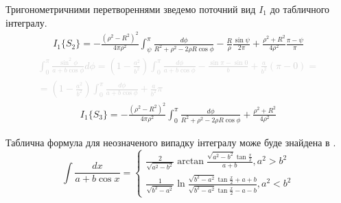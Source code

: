 Тригонометричними перетвореннями зведемо поточний вид $ I_1 $ до табличного 
інтегралу.
%
\begin{equation*} \begin{aligned}
I_{1} \{ S_2 \} = - \frac{\left( \rho^2 - R^2 \right)^2}{4 \pi \rho^2} 
\int_{\psi}^{\pi} \frac{d \phi}{R^2 + \rho^2 - 2 \rho R \cos \phi} - 
\frac{R}{\rho} \frac{\sin \psi}{2 \pi} +  
\frac{\rho^2 + R^2}{4 \rho^2} \frac{\pi - \psi}{\pi}
\end{aligned} \end{equation*}
%
\textcolor{lightgray}{ \begin{equation*} \begin{aligned}
\int_{0}^{\pi} \frac{\sin^2{\phi}}{a + b \cos \phi} d \phi =  
\left( 1 - \frac{a^2}{b^2} \right)
\int_{0}^{\pi} \frac{d \phi}{a + b \cos \phi} -
\frac{\sin \pi - \sin 0}{b} + \frac{a}{b^2} (\pi - 0) = \\
= \left( 1 - \frac{a^2}{b^2} \right)
\int_{0}^{\pi} \frac{d \phi}{a + b \cos \phi} +
\frac{a}{b^2} \pi
\end{aligned} \end{equation*} }
%
\begin{equation*} \begin{aligned}
I_{1} \{ S_3 \} = - \frac{\left( \rho^2 - R^2 \right)^2}{4 \pi \rho^2} 
\int_{0}^{\pi} \frac{d \phi}{R^2 + \rho^2 - 2 \rho R \cos \phi} + 
\frac{\rho^2 + R^2}{4 \rho^2}
\end{aligned} \end{equation*}

Таблична формула для неозначеного випадку інтегралу може буде знайдена в 
\cite[ст. 181]{imp:ElementFunc1983}.
%
\begin{equation} \label{eq:caseTableIntegral}
\int \frac{d x}{a + b \cos{x}} = \begin{cases}
\frac{2}{\sqrt{a^2-b^2}} \arctan \frac{\sqrt{a^2-b^2} \tan \frac{x}{2}}
{a + b}, a^2 > b^2 \\
\frac{1}{\sqrt{b^2-a^2}} \ln 
\frac{\sqrt{b^2-a^2} \tan \frac{x}{2} + a + b}
{\sqrt{b^2-a^2} \tan \frac{x}{2} - a - b}, a^2 < b^2
\end{cases}
\end{equation}


